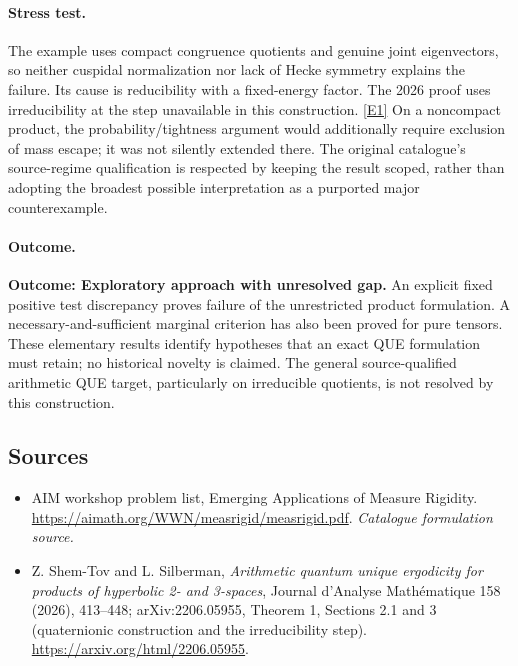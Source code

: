 \documentclass[11pt,a4paper]{article}
\newcommand{\eref}[2]{\hyperlink{extra:#1:#2}{[E#2]}}
\numberwithin{equation}{section}
\begin{document}
\paragraph{Stress test.}
The example uses compact congruence quotients and genuine joint eigenvectors,
so neither cuspidal normalization nor lack of Hecke symmetry explains the
failure. Its cause is reducibility with a fixed-energy factor. The 2026
proof uses irreducibility at the step unavailable in this construction.
\eref{20003326}{1} On a noncompact product, the probability/tightness argument
would additionally require exclusion of mass escape; it was not silently
extended there. The original catalogue's source-regime qualification is
respected by keeping the result scoped, rather than adopting the broadest
possible interpretation as a purported major counterexample.

\paragraph{Outcome.}
\textbf{Outcome: Exploratory approach with unresolved gap.}
An explicit fixed positive test discrepancy proves failure of the unrestricted
product formulation. A necessary-and-sufficient marginal criterion has also
been proved for pure tensors. These elementary results identify hypotheses
that an exact QUE formulation must retain; no historical novelty is claimed.
The general source-qualified arithmetic QUE target, particularly on
irreducible quotients, is not resolved by this construction.

\subsection{Sources}
\begin{itemize}\raggedright
\item[\textnormal{[S1]}]\hypertarget{source:20003326:1}{} AIM workshop problem list, Emerging Applications of Measure Rigidity.
\url{https://aimath.org/WWN/measrigid/measrigid.pdf}.
{\small\textit{Catalogue formulation source.}}
\item[\textnormal{[E1]}]\hypertarget{extra:20003326:1}{} Z. Shem-Tov and L. Silberman,
\emph{Arithmetic quantum unique ergodicity for products of hyperbolic 2- and
3-spaces}, Journal d'Analyse Math\'ematique 158 (2026), 413--448;
arXiv:2206.05955, Theorem 1, Sections 2.1 and 3 (quaternionic construction
and the irreducibility step). \url{https://arxiv.org/html/2206.05955}.

\end{itemize}
\end{document}
